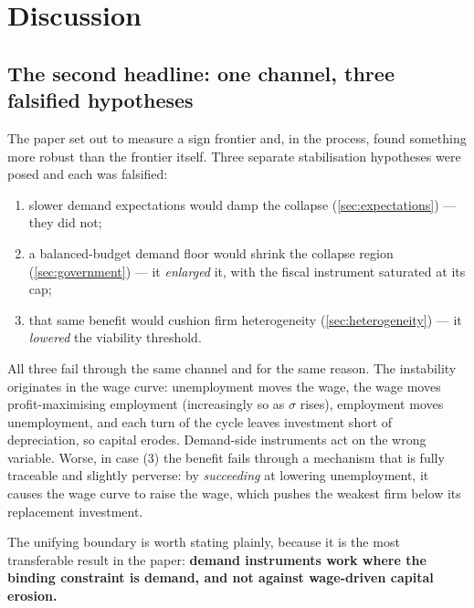 
\section{Discussion}
\label{sec:discussion}

\subsection{The second headline: one channel, three falsified hypotheses}

The paper set out to measure a sign frontier and, in the process, found
something more robust than the frontier itself. Three separate stabilisation
hypotheses were posed and each was falsified:

\begin{enumerate}
  \item slower demand expectations would damp the collapse
  (\cref{sec:expectations}) --- they did not;
  \item a balanced-budget demand floor would shrink the collapse region
  (\cref{sec:government}) --- it \emph{enlarged} it, with the fiscal
  instrument saturated at its cap;
  \item that same benefit would cushion firm heterogeneity
  (\cref{sec:heterogeneity}) --- it \emph{lowered} the viability threshold.
\end{enumerate}

All three fail through the same channel and for the same reason. The
instability originates in the wage curve: unemployment moves the wage, the
wage moves profit-maximising employment (increasingly so as $\sigma$ rises),
employment moves unemployment, and each turn of the cycle leaves investment
short of depreciation, so capital erodes. Demand-side instruments act on the
wrong variable. Worse, in case (3) the benefit fails through a mechanism that
is fully traceable and slightly perverse: by \emph{succeeding} at lowering
unemployment, it causes the wage curve to raise the wage, which pushes the
weakest firm below its replacement investment.

The unifying boundary is worth stating plainly, because it is the most
transferable result in the paper: \textbf{demand instruments work where the
binding constraint is demand, and not against wage-driven capital erosion.}

